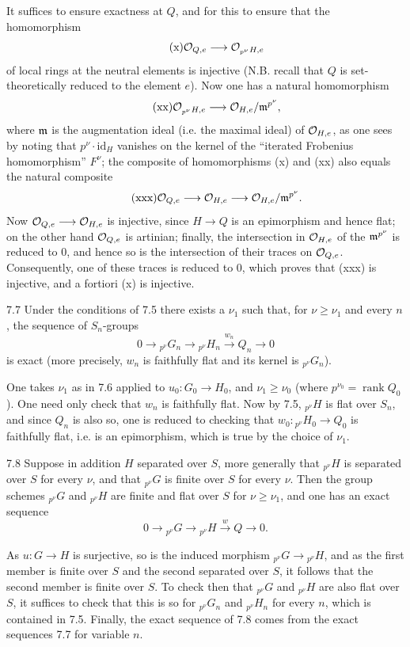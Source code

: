 It suffices to ensure exactness at $Q$, and for this to ensure that the homomorphism
\begin{equation}\tag{x}
\mathcal{O}_{Q,e}\longrightarrow\mathcal{O}_{{}_{p^\nu}H,e}
\end{equation}
of local rings at the neutral elements is injective (N.B. recall that $Q$ is set-theoretically reduced to the element $e$). Now one has a natural homomorphism
\begin{equation}\tag{xx}
\mathcal{O}_{{}_{p^\nu}H,e}\longrightarrow\mathcal{O}_{H,e}/\mathfrak m^{p^\nu},
\end{equation}
where $\mathfrak m$ is the augmentation ideal (i.e. the maximal ideal) of $\mathcal{O}_{H,e}$, as one sees by noting that $p^\nu\cdot\mathrm{id}_H$ vanishes on the kernel of the ``iterated Frobenius homomorphism'' $F^\nu$; the composite of homomorphisms (x) and (xx) also equals the natural composite
\begin{equation}\tag{xxx}
\mathcal{O}_{Q,e}\longrightarrow\mathcal{O}_{H,e}\longrightarrow\mathcal{O}_{H,e}/\mathfrak m^{p^\nu}.
\end{equation}
Now $\mathcal{O}_{Q,e}\longrightarrow\mathcal{O}_{H,e}$ is injective, since $H\to Q$ is an epimorphism and hence flat; on the other hand $\mathcal{O}_{Q,e}$ is artinian; finally, the intersection in $\mathcal{O}_{H,e}$ of the $\mathfrak m^{p^\nu}$ is reduced to 0, and hence so is the intersection of their traces on $\mathcal{O}_{Q,e}$. Consequently, one of these traces is reduced to 0, which proves that (xxx) is injective, and a fortiori (x) is injective.
\begin{lemma}{7.7}\label{VIII.7.7}
Under the conditions of 7.5 there exists a $\nu_1$ such that, for $\nu\geq\nu_1$ and every $n$, the sequence of $S_n$-groups
\[
0\to{}_{p^\nu}G_n\to{}_{p^\nu}H_n\xrightarrow{w_n}Q_n\to0
\]
is exact (more precisely, $w_n$ is faithfully flat and its kernel is ${}_{p^\nu}G_n$).
\end{lemma}
One takes $\nu_1$ as in 7.6 applied to $u_0:G_0\to H_0$, and $\nu_1\geq\nu_0$ (where $p^{\nu_0}=\operatorname{rank}Q_0$). One need only check that $w_n$ is faithfully flat. Now by 7.5, ${}_{p^\nu}H$ is flat over $S_n$, and since $Q_n$ is also so, one is reduced to checking that $w_0:{}_{p^\nu}H_0\to Q_0$ is faithfully flat, i.e. is an epimorphism, which is true by the choice of $\nu_1$.
\begin{corollary}{7.8}\label{VIII.7.8}
Suppose in addition $H$ separated over $S$, more generally that ${}_{p^\nu}H$ is separated over $S$ for every $\nu$, and that ${}_{p^\nu}G$ is finite over $S$ for every $\nu$. Then the group schemes ${}_{p^\nu}G$ and ${}_{p^\nu}H$ are finite and flat over $S$ for $\nu\geq\nu_1$, and one has an exact sequence
\[
0\to{}_{p^\nu}G\to{}_{p^\nu}H\xrightarrow{w}Q\to0.
\]
\end{corollary}
As $u:G\to H$ is surjective, so is the induced morphism ${}_{p^\nu}G\to{}_{p^\nu}H$, and as the first member is finite over $S$ and the second separated over $S$, it follows that the second member is finite over $S$. To check then that ${}_{p^\nu}G$ and ${}_{p^\nu}H$ are also flat over $S$, it suffices to check that this is so for ${}_{p^\nu}G_n$ and ${}_{p^\nu}H_n$ for every $n$, which is contained in 7.5. Finally, the exact sequence of 7.8 comes from the exact sequences 7.7 for variable $n$.

